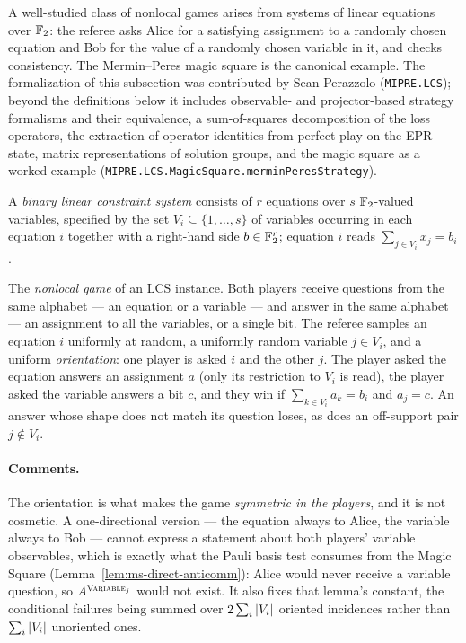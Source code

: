 A well-studied class of nonlocal games arises from systems of linear equations over
$\mathbb{F}_2$: the referee asks Alice for a satisfying assignment to a randomly chosen
equation and Bob for the value of a randomly chosen variable in it, and checks
consistency. The Mermin--Peres magic square is the canonical example. The
formalization of this subsection was contributed by Sean Perazzolo
(\texttt{MIPRE.LCS}); beyond the definitions below it includes observable- and
projector-based strategy formalisms and their equivalence, a sum-of-squares
decomposition of the loss operators, the extraction of operator identities from
perfect play on the EPR state, matrix representations of solution groups, and the
magic square as a worked example
(\texttt{MIPRE.LCS.MagicSquare.merminPeresStrategy}).

\begin{definition}
\label{def:lcs-instance}
\leanok
A \emph{binary linear constraint system} consists of $r$ equations over $s$
$\mathbb{F}_2$-valued variables, specified by the set $V_i \subseteq \{1, \dots, s\}$ of
variables occurring in each equation $i$ together with a right-hand side
$b \in \mathbb{F}_2^r$; equation $i$ reads $\sum_{j \in V_i} x_j = b_i$.
\end{definition}

\begin{definition}
\label{def:lcs-game}
\leanok
The \emph{nonlocal game} of an LCS instance. Both players receive questions from the same
alphabet --- an equation or a variable --- and answer in the same alphabet --- an assignment
to all the variables, or a single bit. The referee samples an equation $i$ uniformly at
random, a uniformly random variable $j \in V_i$, and a uniform \emph{orientation}: one
player is asked $i$ and the other $j$. The player asked the equation answers an assignment
$a$ (only its restriction to $V_i$ is read), the player asked the variable answers a bit $c$,
and they win if $\sum_{k \in V_i} a_k = b_i$ and $a_j = c$. An answer whose shape does not
match its question loses, as does an off-support pair $j \notin V_i$.
\end{definition}

\paragraph{Comments.} The orientation is what makes the game \emph{symmetric in the players},
and it is not cosmetic. A one-directional version --- the equation always to Alice, the
variable always to Bob --- cannot express a statement about both players' variable
observables, which is exactly what the Pauli basis test consumes from the Magic Square
(Lemma~\ref{lem:ms-direct-anticomm}): Alice would never receive a variable question, so
$A^{\textsc{Variable}_j}$ would not exist. It also fixes that lemma's constant, the conditional
failures being summed over $2 \sum_i \left\vert {V_i} \right\vert$ oriented incidences rather than
$\sum_i \left\vert {V_i} \right\vert$ unoriented ones.

